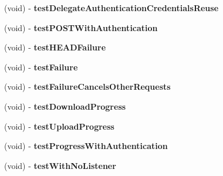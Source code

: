 \begin{DoxyCompactItemize}
\item 
\hypertarget{interface_a_s_i_network_queue_tests_ad451f41961e411ca4e0a493564f3782e}{
(void) -\/ {\bfseries test\-Delegate\-Authentication\-Credentials\-Reuse}}
\label{interface_a_s_i_network_queue_tests_ad451f41961e411ca4e0a493564f3782e}

\item 
\hypertarget{interface_a_s_i_network_queue_tests_aa73ecf9606cf1826f4137aef4ff343be}{
(void) -\/ {\bfseries test\-P\-O\-S\-T\-With\-Authentication}}
\label{interface_a_s_i_network_queue_tests_aa73ecf9606cf1826f4137aef4ff343be}

\item 
\hypertarget{interface_a_s_i_network_queue_tests_aa50e545358ffc84eea2a4f61e6d782eb}{
(void) -\/ {\bfseries test\-H\-E\-A\-D\-Failure}}
\label{interface_a_s_i_network_queue_tests_aa50e545358ffc84eea2a4f61e6d782eb}

\item 
\hypertarget{interface_a_s_i_network_queue_tests_a676be0402a758bbd669e8b11f7bb368d}{
(void) -\/ {\bfseries test\-Failure}}
\label{interface_a_s_i_network_queue_tests_a676be0402a758bbd669e8b11f7bb368d}

\item 
\hypertarget{interface_a_s_i_network_queue_tests_a1d3ea45df0ebc0597e234c1a2fa3c35b}{
(void) -\/ {\bfseries test\-Failure\-Cancels\-Other\-Requests}}
\label{interface_a_s_i_network_queue_tests_a1d3ea45df0ebc0597e234c1a2fa3c35b}

\item 
\hypertarget{interface_a_s_i_network_queue_tests_a59b48bbf964a2a4ac6626270d519748a}{
(void) -\/ {\bfseries test\-Download\-Progress}}
\label{interface_a_s_i_network_queue_tests_a59b48bbf964a2a4ac6626270d519748a}

\item 
\hypertarget{interface_a_s_i_network_queue_tests_a75e8fb03b62a4a3c8be34b64407c508a}{
(void) -\/ {\bfseries test\-Upload\-Progress}}
\label{interface_a_s_i_network_queue_tests_a75e8fb03b62a4a3c8be34b64407c508a}

\item 
\hypertarget{interface_a_s_i_network_queue_tests_aa1ec111c87e8672ac36cf638d41acb23}{
(void) -\/ {\bfseries test\-Progress\-With\-Authentication}}
\label{interface_a_s_i_network_queue_tests_aa1ec111c87e8672ac36cf638d41acb23}

\item 
\hypertarget{interface_a_s_i_network_queue_tests_a3ed1658a28f4bc0ac237d7c3793f53f1}{
(void) -\/ {\bfseries test\-With\-No\-Listener}}
\label{interface_a_s_i_network_queue_tests_a3ed1658a28f4bc0ac237d7c3793f53f1}


\end{DoxyCompactItemize}
